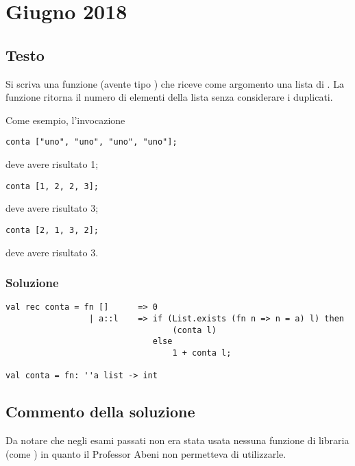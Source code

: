 \section{Giugno 2018}

\subsection{Testo}

Si scriva una funzione  (avente tipo ) che riceve come argomento una lista di .
La funzione  ritorna il numero di elementi della lista senza considerare i duplicati.

\medskip
Come esempio, l'invocazione

\begin{lstlisting}
conta ["uno", "uno", "uno", "uno"];
\end{lstlisting}

deve avere risultato 1;

\begin{lstlisting}
conta [1, 2, 2, 3];
\end{lstlisting}

deve avere risultato 3;

\begin{lstlisting}
conta [2, 1, 3, 2];
\end{lstlisting}

deve avere risultato 3.

\subsubsection{Soluzione}

\begin{lstlisting}[style = SML, caption = {Definizione della funzione \sml{conta}}]
val rec conta = fn [] 	   => 0
		         | a::l    => if (List.exists (fn n => n = a) l) then
		 					      (conta l)
							  else
					              1 + conta l;

val conta = fn: ''a list -> int
\end{lstlisting}

\subsection{Commento della soluzione}

Da notare che negli esami passati non era stata usata nessuna funzione di libraria (come ) in quanto il Professor Abeni non permetteva di utilizzarle.
